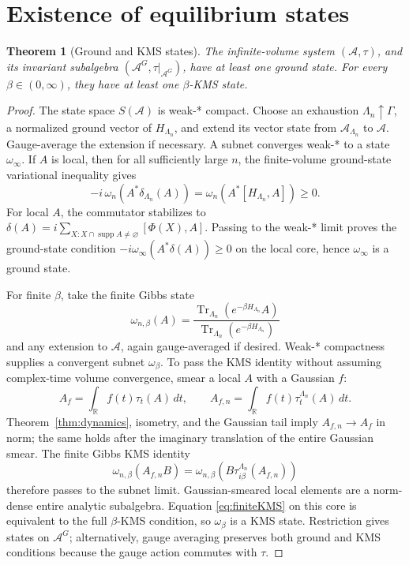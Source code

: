 \documentclass[11pt]{article}
\newtheorem{theorem}{Theorem}[section]
\theoremstyle{remark}
\newcommand{\A}{\mathcal A}
\newcommand{\supp}{\operatorname{supp}}
\begin{document}
\section{Existence of equilibrium states}

\begin{theorem}[Ground and KMS states]
\label{thm:states}
The infinite-volume system \((\A,\tau)\), and its invariant subalgebra
\((\A^G,\tau|_{\A^G})\), have at least one ground state.  For every
\(\beta\in(0,\infty)\), they have at least one \(\beta\)-KMS state.
\end{theorem}

\begin{proof}
The state space \(S(\A)\) is weak-* compact.  Choose an exhaustion
\(\Lambda_n\uparrow\Gamma\), a normalized ground vector of \(H_{\Lambda_n}\),
and extend its vector state from \(\A_{\Lambda_n}\) to \(\A\).  Gauge-average
the extension if necessary.  A subnet converges weak-* to a state
\(\omega_\infty\).  If \(A\) is local, then for all sufficiently large
\(n\), the finite-volume ground-state variational inequality gives
\[
 -i\,\omega_n(A^*\delta_{\Lambda_n}(A))
 =\omega_n\!\left(A^*[H_{\Lambda_n},A]\right)\geq0.
\tag{5.1}\label{eq:groundineq}
\]
For local \(A\), the commutator stabilizes to
\(\delta(A)=i\sum_{X:X\cap\supp A\ne\varnothing}[\Phi(X),A]\).
Passing to the weak-* limit proves the ground-state condition
\(-i\omega_\infty(A^*\delta(A))\geq0\) on the local core, hence
\(\omega_\infty\) is a ground state.

For finite \(\beta\), take the finite Gibbs state
\[
 \omega_{n,\beta}(A)=
 \frac{\operatorname{Tr}_{\Lambda_n}
 (e^{-\beta H_{\Lambda_n}}A)}
 {\operatorname{Tr}_{\Lambda_n}(e^{-\beta H_{\Lambda_n}})}
\tag{5.2}\label{eq:gibbs}
\]
and any extension to \(\A\), again gauge-averaged if desired.  Weak-*
compactness supplies a convergent subnet \(\omega_\beta\).
To pass the KMS identity without assuming complex-time volume convergence,
smear a local \(A\) with a Gaussian \(f\):
\[
 A_f=\int_{\mathbb R}f(t)\tau_t(A)\,dt,\qquad
 A_{f,n}=\int_{\mathbb R}f(t)\tau_t^{\Lambda_n}(A)\,dt.
\tag{5.3}\label{eq:smear}
\]
Theorem~\ref{thm:dynamics}, isometry, and the Gaussian tail imply
\(A_{f,n}\to A_f\) in norm; the same holds after the imaginary translation
of the entire Gaussian smear.  The finite Gibbs KMS identity
\[
 \omega_{n,\beta}(A_{f,n}B)
 =\omega_{n,\beta}\!\left(B\tau_{i\beta}^{\Lambda_n}(A_{f,n})\right)
\tag{5.4}\label{eq:finiteKMS}
\]
therefore passes to the subnet limit.  Gaussian-smeared local elements are
a norm-dense entire analytic subalgebra.  Equation
\eqref{eq:finiteKMS} on this core is equivalent to the full
\(\beta\)-KMS condition, so \(\omega_\beta\) is a KMS state.
Restriction gives states on \(\A^G\); alternatively, gauge averaging
preserves both ground and KMS conditions because the gauge action commutes
with \(\tau\).
\end{proof}
\end{document}
